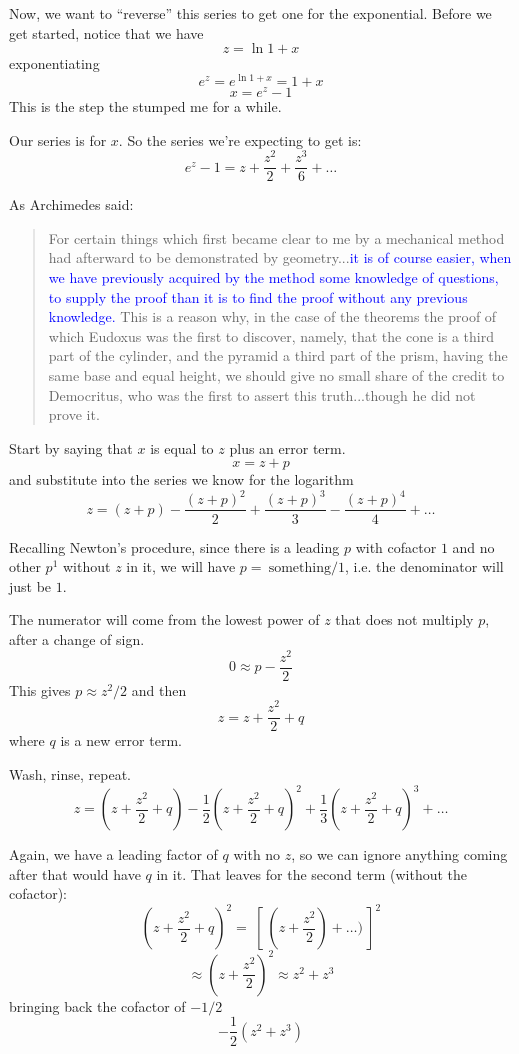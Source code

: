 \documentclass[11pt, oneside]{article}
\begin{document}
Now, we want to ``reverse'' this series to get one for the exponential.  Before we get started, notice that we have
\[ z = \ln 1 + x \]
exponentiating
\[ e^z = e^{\ln 1 + x} = 1 + x \]
\[ x = e^z - 1 \]
This is the step the stumped me for a while.  

Our series is for $x$.  So the series we're expecting to get is:
\[ e^z - 1 = z +  \frac{z^2}{2} + \frac{z^3}{6} + \dots \]

As Archimedes said:

\begin{quote}For certain things which first became clear to me by a mechanical method had afterward to be demonstrated by geometry...\textcolor{blue}{it is of course easier, when we have previously acquired by the method some knowledge of questions, to supply the proof than it is to find the proof without any previous knowledge.} This is a reason why, in the case of the theorems the proof of which Eudoxus was the first to discover, namely, that the cone is a third part of the cylinder, and the pyramid a third part of the prism, having the same base and equal height, we should give no small share of the credit to Democritus, who was the first to assert this truth...though he did not prove it.
\end{quote}

Start by saying that $x$ is equal to $z$ plus an error term.
\[ x = z + p \]
and substitute into the series we know for the logarithm
\[ z = (z + p) - \frac{(z + p)^2}{2} + \frac{(z + p)^3}{3} - \frac{(z + p)^4}{4} + \dots \]

Recalling Newton's procedure, since there is a leading $p$ with cofactor $1$ and no other $p^1$ without $z$ in it, we will have $p = \ \text{something}/1$, i.e. the denominator will just be $1$.  

The numerator will come from the lowest power of $z$ that does not multiply $p$, after a change of sign.
\[ 0 \approx p - \frac{z^2}{2} \]
This gives $p \approx z^2/2$ and then
\[ z = z +  \frac{z^2}{2} + q \]
where $q$ is a new error term.

Wash, rinse, repeat.
\[ z = (z +  \frac{z^2}{2} + q) - \frac{1}{2} (z +  \frac{z^2}{2} + q)^2 + \frac{1}{3} (z +  \frac{z^2}{2} + q)^3 +  \dots \]

Again, we have a leading factor of $q$ with no $z$, so we can ignore anything coming after that would have $q$ in it.  That leaves for the second term (without the cofactor):
\[  (z +  \frac{z^2}{2} + q)^2 =  \ [ \ (z + \frac{z^2}{2}) + \dots) \ ]^2 \]
\[ \approx (z + \frac{z^2}{2})^2 \approx z^2 + z^3 \]
bringing back the cofactor of $-1/2$ 
\[ -\frac{1}{2}( z^2 + z^3) \]
\end{document}
